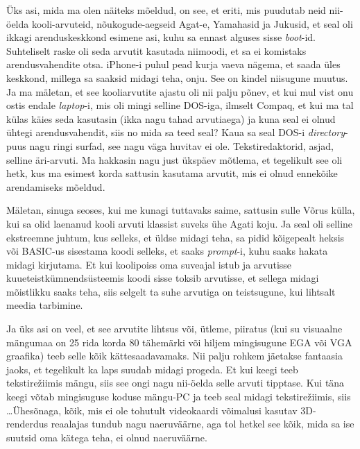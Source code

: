 Üks asi, mida ma olen näiteks mõeldud, on see, et eriti, mis puudutab neid 
nii-öelda kooli-arvuteid, nõukogude-aegseid Agat-e, 
Yamahasid ja Jukusid, et seal oli 
ikkagi arenduskeskkond esimene asi, kuhu sa ennast alguses sisse 
\emph{boot}-id. Suhteliselt  raske oli seda arvutit kasutada niimoodi, et sa ei 
komistaks  arendusvahendite otsa. iPhone-i puhul  pead kurja 
vaeva nägema, et saada üles keskkond, millega sa saaksid midagi teha, onju. See 
on kindel niisugune muutus. Ja ma mäletan, et see kooliarvutite ajastu oli nii 
palju põnev, et kui mul vist onu ostis endale \emph{laptop}-i, mis oli mingi 
selline 
DOS-iga, ilmselt Compaq, et kui ma tal külas käies seda kasutasin (ikka nagu 
tahad arvutiaega) ja kuna seal ei olnud ühtegi arendusvahendit, siis no mida sa 
teed seal? Kaua sa seal DOS-i \emph{directory}-puus nagu ringi surfad, see nagu 
 väga huvitav ei ole. Tekstiredaktorid, asjad, selline äri-arvuti. Ma hakkasin 
nagu just ükspäev mõtlema, et tegelikult see oli hetk, kus ma esimest korda 
sattusin kasutama arvutit, mis ei olnud ennekõike arendamiseks mõeldud. 

Mäletan, sinuga seoses, kui me kunagi tuttavaks saime, sattusin sulle Võrus 
külla, kui sa olid laenanud kooli arvuti klassist suveks ühe 
Agati koju. Ja seal oli selline ekstreemne juhtum, kus 
selleks, et üldse midagi teha, sa pidid kõigepealt heksis või BASIC-us 
sisestama koodi selleks, et saaks \emph{prompt}-i, kuhu saaks hakata midagi 
kirjutama. Et kui koolipoiss oma suveajal istub ja arvutisse 
kuueteistkümnendsüsteemis koodi sisse toksib arvutisse,  et sellega  midagi 
mõistlikku saaks teha, siis selgelt ta suhe  arvutiga on teistsugune, kui 
lihtsalt meedia tarbimine. 

Ja üks asi on veel, et see arvutite lihtsus või, ütleme, piiratus (kui su 
visuaalne mängumaa on 25 rida korda 80 tähemärki või hiljem mingisugune EGA või 
VGA graafika) teeb selle kõik kättesaadavamaks. Nii palju rohkem jäetakse 
fantaasia jaoks, et tegelikult ka laps suudab  midagi progeda. Et kui keegi 
teeb tekstirežiimis mängu, siis see ongi nagu nii-öelda selle arvuti tipptase. 
Kui täna keegi võtab mingisuguse koduse mängu-PC ja teeb seal midagi 
tekstirežiimis, siis \dots Ühesõnaga, kõik, mis ei ole tohutult videokaardi 
võimalusi kasutav 3D-renderdus  reaalajas tundub nagu naeruväärne, aga tol 
hetkel see kõik, mida sa ise suutsid oma kätega teha, ei olnud naeruväärne. 


